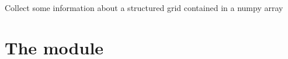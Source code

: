 \documentclass[letterpaper,10pt,english]{sphinxmanual}
\begin{document}

\begin{fulllineitems}
\label{\detokenize{appendices:s2Dcd.grid.sg_info}}
Collect some information about a structured grid
contained in a numpy array

\end{fulllineitems}



\section{The  module}
\end{document}
